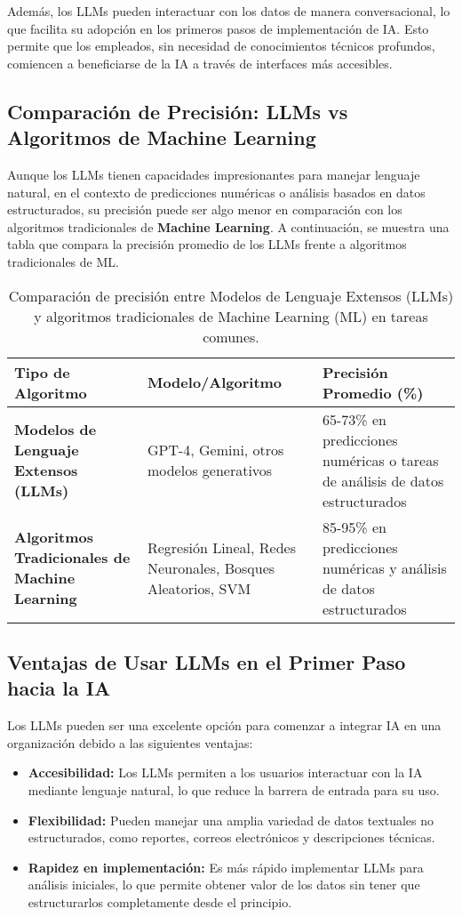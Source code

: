 Además, los LLMs pueden interactuar con los datos de manera conversacional, lo que facilita su adopción en los primeros pasos de implementación de IA. Esto permite que los empleados, sin necesidad de conocimientos técnicos profundos, comiencen a beneficiarse de la IA a través de interfaces más accesibles.

\subsection{Comparación de Precisión: LLMs vs Algoritmos de Machine Learning}
Aunque los LLMs tienen capacidades impresionantes para manejar lenguaje natural, en el contexto de predicciones numéricas o análisis basados en datos estructurados, su precisión puede ser algo menor en comparación con los algoritmos tradicionales de \textbf{Machine Learning}. A continuación, se muestra una tabla que compara la precisión promedio de los LLMs frente a algoritmos tradicionales de ML.

\begin{table}[htbp]
\centering
\caption{Comparación de precisión entre Modelos de Lenguaje Extensos (LLMs) y algoritmos tradicionales de Machine Learning (ML) en tareas comunes.}
\label{tab:precision-llm-ml}
\begin{tabularx}{\textwidth}{|X|X|X|}
\hline
\textbf{Tipo de Algoritmo} & \textbf{Modelo/Algoritmo} & \textbf{Precisión Promedio (\%)} \\
\hline
\textbf{Modelos de Lenguaje Extensos (LLMs)} & GPT-4, Gemini, otros modelos generativos & 65-73\% en predicciones numéricas o tareas de análisis de datos estructurados \\
\hline
\textbf{Algoritmos Tradicionales de Machine Learning} & Regresión Lineal, Redes Neuronales, Bosques Aleatorios, SVM & 85-95\% en predicciones numéricas y análisis de datos estructurados \\
\hline
\end{tabularx}
\end{table}

\subsection{Ventajas de Usar LLMs en el Primer Paso hacia la IA}
Los LLMs pueden ser una excelente opción para comenzar a integrar IA en una organización debido a las siguientes ventajas:
\begin{itemize}
    \item \textbf{Accesibilidad:} Los LLMs permiten a los usuarios interactuar con la IA mediante lenguaje natural, lo que reduce la barrera de entrada para su uso.
    \item \textbf{Flexibilidad:} Pueden manejar una amplia variedad de datos textuales no estructurados, como reportes, correos electrónicos y descripciones técnicas.
    \item \textbf{Rapidez en implementación:} Es más rápido implementar LLMs para análisis iniciales, lo que permite obtener valor de los datos sin tener que estructurarlos completamente desde el principio.
\end{itemize}

